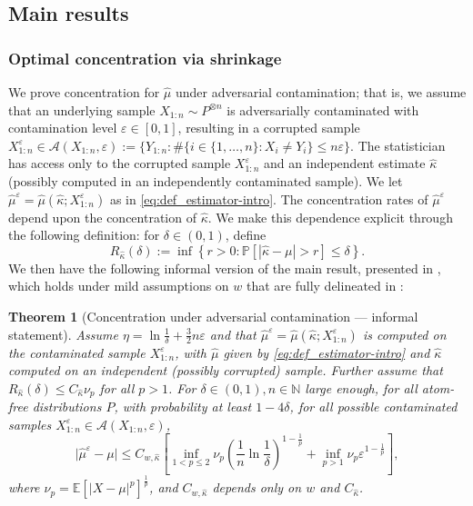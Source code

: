 \documentclass{article}
\theoremstyle{plain}
\newtheorem{theorem}{Theorem}[section]
\theoremstyle{definition}
\def\N{\mathbb{N}} %
\renewcommand{\Pr}{\mathbb{P}}
\def\sA{\mathcal{A}}
\begin{document}
\subsection{Main results}
\subsubsection{Optimal concentration via shrinkage}\label{sec:optimal_concentration}
We prove concentration for \( \widehat{\mu }  \) under adversarial contamination; that is, we assume that an underlying sample \( X_{1:n} \sim P^{\otimes n}\) is adversarially contaminated with contamination level \( \varepsilon \in [0,1] \), resulting in a corrupted sample \( X_{1:n}^\varepsilon \in \sA(X_{1:n},\varepsilon ):=\{Y_{1:n}: \#\{i \in \{1,\ldots,n\}: X_i \neq Y_i \}\le n \varepsilon  \}  \). The statistician has access only to the corrupted sample \( X_{1:n}^\varepsilon  \) and an independent estimate \( \widehat{\kappa }  \) (possibly computed in an independently contaminated sample). We let \( \widehat{\mu }^\varepsilon =\widehat{\mu }(\widehat{\kappa } ;X_{1:n}^\varepsilon )  \) as in \eqref{eq:def_estimator-intro}. The concentration rates of \( \widehat{\mu }^\varepsilon   \) depend upon the concentration of \( \widehat{\kappa } \). We make this dependence explicit through the following definition: for \( \delta \in (0,1) \), define 
\begin{equation}\label{eq:def-error-adv}
  R_{\widehat{\kappa }}(\delta) := \inf\left\{r>0 : \Pr\left[|\widehat{\kappa }- \mu| > r\right] \leq \delta \right\}.
\end{equation}
We then have the following informal version of the main result, presented in , which holds under mild assumptions on \( w \) that are fully delineated in :
\begin{theorem}[Concentration under adversarial contamination --- informal statement]\label{thm:adv_informal}
  Assume \( \eta=\ln \frac{1}{\delta }+\frac{3}{2}n \varepsilon  \) and that \( \widehat{\mu }^\varepsilon=\widehat{\mu }(\widehat{\kappa };X_{1:n}^\varepsilon  )    \) is computed on the contaminated sample \( X_{1:n}^\varepsilon  \), with \( \widehat{\mu }  \)  given by \eqref{eq:def_estimator-intro} and $\widehat{\kappa}$ computed on an independent (possibly corrupted) sample. Further assume that \( R_{\widehat{\kappa } }(\delta ) \le C_{\widehat{\kappa } } \nu_p \) for all \( p>1 \). For \( \delta \in (0,1), n\in \N \) large enough, for all atom-free distributions \( P \), with probability at least \( 1-4\delta  \), for all possible contaminated samples \( X_{1:n}^\varepsilon  \in \sA(X_{1:n},\varepsilon ) \),   \begin{equation}\label{eq:adv_bound_intro}
    \lvert \widehat{\mu}^\varepsilon -\mu   \rvert \le C_{w,\widehat{\kappa }} \left[\inf_{1<p \le  2}\nu_p\left(\frac{1}{n}\ln \frac{1}{\delta }\right)^{1-\frac{1}{p}} + \inf_{p>1}\nu _p\varepsilon ^{1-\frac{1}{p}}\right],
  \end{equation}      
  where \( \nu_p = \mathbb{E}\left[\lvert X-\mu  \rvert^p \right]^{\frac{1}{p}} \), and \( C_{w,\widehat{\kappa }  } \) depends only on \( w \) and \( C_{\widehat{\kappa } } \).
\end{theorem}
\end{document}
